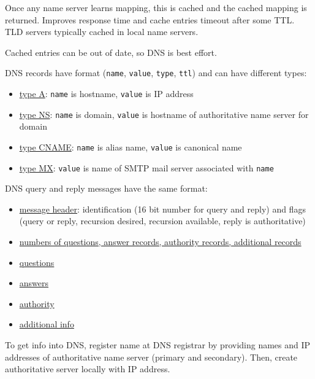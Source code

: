 \documentclass[11pt]{article}
\begin{document}
Once any name server learns mapping, this is cached and the cached mapping is returned.
Improves response time and cache entries timeout after some TTL.
TLD servers typically cached in local name servers.

Cached entries can be out of date, so DNS is best effort.

DNS records have format (\texttt{name}, \texttt{value}, \texttt{type}, \texttt{ttl}) and can have different types:
\begin{itemize}
\item \uline{type A}: \texttt{name} is hostname, \texttt{value} is IP address
\item \uline{type NS}: \texttt{name} is domain, \texttt{value} is hostname of authoritative name server for domain
\item \uline{type CNAME}: \texttt{name} is alias name, \texttt{value} is canonical name
\item \uline{type MX}: \texttt{value} is name of SMTP mail server associated with \texttt{name}
\end{itemize}

DNS query and reply messages have the same format:
\begin{itemize}
\item \uline{message header}: identification (16 bit number for query and reply) and flags (query or reply,
recursion desired, recursion available, reply is authoritative)
\item \uline{numbers of questions, answer records, authority records, additional records}
\item \uline{questions}
\item \uline{answers}
\item \uline{authority}
\item \uline{additional info}
\end{itemize}

To get info into DNS, register name at DNS registrar by providing names and IP addresses of authoritative
name server (primary and secondary).
Then, create authoritative server locally with IP address.
\end{document}
